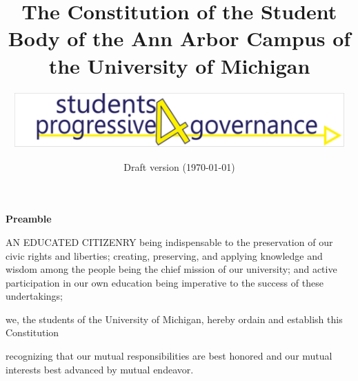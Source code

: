 \documentclass{constitution}
\begin{document}
	\title{The Constitution of the Student Body of the Ann Arbor Campus of the University of Michigan}
	\author{\includegraphics[width=5in]{S4PGlogo}}
	\date{Draft version (\today)}
	\maketitle
	\tableofcontents
	\newpage

	\pagestyle{fancy}
	\headheight 35pt
	\thispagestyle{empty}
	\linenumbers
	
	\begin{center}
		\bfseries Preamble
	\end{center}

	AN EDUCATED CITIZENRY being indispensable to the preservation of our civic rights and liberties; creating, preserving, and applying knowledge and wisdom among the people being the chief mission of our university; and active participation in our own education being imperative to the success of these undertakings;

	    we, the students of the University of Michigan, hereby ordain and establish this Constitution

	recognizing that our mutual responsibilities are best honored and our mutual interests best advanced by mutual endeavor.
	

	

	
	
	
	
	
	
	
	
	
	

	
	
	
\end{document}
